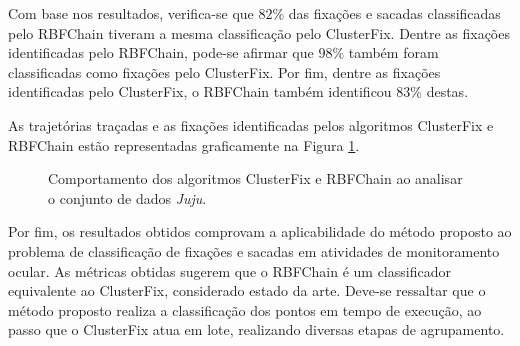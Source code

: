 \documentclass[msc, classic, a4paper]{ufbathesis}
\begin{document}
Com base nos resultados, verifica-se que $82\%$ das fixações e sacadas classificadas pelo RBFChain tiveram a mesma classificação pelo ClusterFix. Dentre as fixações identificadas pelo RBFChain, pode-se afirmar que $98\%$ também foram classificadas como fixações pelo ClusterFix. Por fim, dentre as fixações identificadas pelo ClusterFix, o RBFChain também identificou $83\%$ destas.

As trajetórias traçadas e as fixações identificadas pelos algoritmos ClusterFix e RBFChain estão representadas graficamente na Figura \ref{fig:comparacao_juju}.

\begin{figure}[ht]%
\centering
{}%
\qquad
{}%
\caption{Comportamento dos algoritmos ClusterFix e RBFChain ao analisar o conjunto de dados \textit{Juju}.}
\label{fig:comparacao_juju}%
\end{figure}

Por fim, os resultados obtidos comprovam a aplicabilidade do método proposto ao problema de classificação de fixações e sacadas em atividades de monitoramento ocular.
As métricas obtidas sugerem que o RBFChain é um classificador equivalente ao ClusterFix, considerado estado da arte.
Deve-se ressaltar que o método proposto realiza a classificação dos pontos em tempo de execução, ao passo que o ClusterFix atua em lote, realizando diversas etapas de agrupamento.
\end{document}
